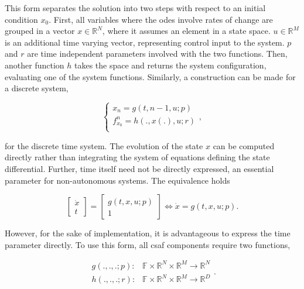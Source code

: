 This form separates the solution into two steps with respect to an initial condition $x_0$. First, all variables 
where the \acrshort{ode}s involve rates of change are grouped in a vector $x \in \mathbb R^N$, where it 
assumes an element in a state space. $u \in \mathbb R^M$ is an additional time varying vector, representing 
control input to the system. $p$ and $r$ are time independent parameters involved with the two functions. 
Then, another function $h$ takes the space and returns the system configuration, evaluating one of the 
system functions. Similarly, a construction can be made for a discrete system,

\begin{equation}
\begin{cases}
x_{n} = g(t, n-1, u; p)\\
f^{n}_{x_0} = h(., x(.), u; r) \\
\end{cases},
\end{equation}

for the discrete time system. The evolution of the state $x$ can be computed directly rather than integrating 
the system of equations defining the state differential. Further, time itself need not be directly expressed, an 
essential parameter for non-autonomous systems. The equivalence holds

\begin{equation}
\begin{bmatrix}
\dot x \\
t
\end{bmatrix} = 
\begin{bmatrix}
g(t, x, u; p) \\
1
\end{bmatrix} \iff \dot x = g(t, x, u;p) .
\end{equation}

However, for the sake of implementation, it is advantageous to express the time parameter directly. To use 
this form, all \acrshort{csaf}  components require two functions, 

\begin{equation}
\begin{aligned}
g(.,.,.;p):& \mathbb F \times \mathbb R^N \times \mathbb R^M \rightarrow \mathbb R^N \\
h(.,.,.;r):& \mathbb F \times \mathbb R^N \times \mathbb R^M \rightarrow \mathbb R^D
\end{aligned}.
\end{equation}

